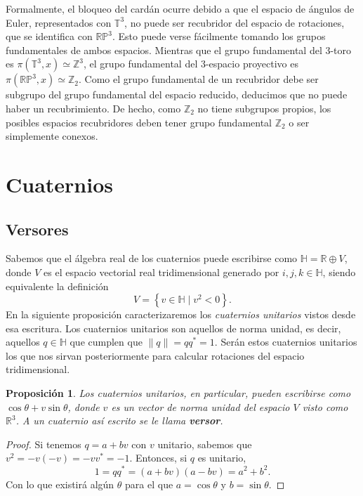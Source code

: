 \documentclass{article}
\theoremstyle{plain}
\newtheorem{proposition}{Proposición}
\theoremstyle{definition}
\theoremstyle{remark}
\begin{document}
Formalmente, el bloqueo del cardán ocurre debido a que el espacio de
ángulos de Euler, representados con $\mathbb T^3$, no puede ser
recubridor del espacio de rotaciones, que se identifica con
$\mathbb{RP}^3$. Esto puede verse fácilmente tomando los grupos
fundamentales de ambos espacios. Mientras que el grupo fundamental del
3-toro es $\pi(\mathbb T^3, x) \simeq \mathbb Z^3$, el grupo
fundamental del 3-espacio proyectivo es
$\pi(\mathbb{RP}^3, x) \simeq \mathbb Z_2$. Como el grupo fundamental
de un recubridor debe ser subgrupo del grupo fundamental del espacio
reducido, deducimos que no puede haber un recubrimiento. De hecho,
como $\mathbb Z_2$ no tiene subgrupos propios, los posibles espacios
recubridores deben tener grupo fundamental $\mathbb Z_2$ o ser simplemente
conexos.

\section{Cuaternios}
\subsection{Versores}
Sabemos que el álgebra real de los cuaternios puede escribirse como
$\mathbb{H} = \mathbb{R} \oplus V$, donde $V$ es el espacio vectorial
real tridimensional generado por $i,j,k \in \mathbb{H}$, siendo equivalente la
definición
\[
  V = \left\{ v \in \mathbb{H} \mid v^2 < 0 \right\}.
\]
En la siguiente proposición caracterizaremos los \textit{cuaternios unitarios}
vistos desde esa escritura. Los cuaternios unitarios son aquellos de norma
unidad, es decir, aquellos $q \in \mathbb{H}$ que cumplen que
$\|q\| = qq^\ast = 1$. Serán estos cuaternios unitarios los que nos sirvan
posteriormente para calcular rotaciones del espacio tridimensional.

\begin{proposition}
Los cuaternios unitarios, en particular, pueden escribirse como
$\cos \theta + v \sin \theta$, donde $v$ es un vector de norma unidad del
espacio $V$ visto como $\mathbb{R}^3$. A un cuaternio así escrito se le llama
\textbf{versor}.
\end{proposition}
\begin{proof}
  Si tenemos $q = a + bv$ con $v$ unitario, sabemos que $v^2 = - v(-v) = - vv^\ast = -1$.
  Entonces, si $q$ es unitario,
  \[
    1 = qq^\ast = (a+bv)(a-bv) = a^2 + b^2.
  \]
  Con lo que existirá algún $\theta$ para el que $a = \cos \theta$ y $b = \sin \theta$.
\end{proof}
\end{document}

